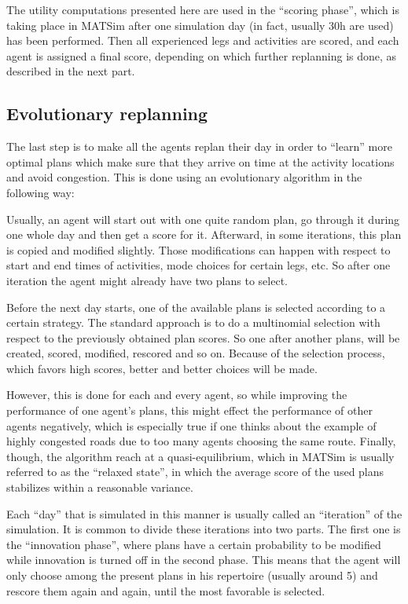 The utility computations presented here are used in the ``scoring phase'', which
is taking place in MATSim after one simulation day (in fact, usually 30h are
used) has been performed. Then all experienced legs and activities are scored, and
each agent is assigned a final score, depending on which further replanning is done,
as described in the next part.

\subsection{Evolutionary replanning}

The last step is to make all the agents replan their day
in order to ``learn'' more optimal plans which
make sure that they arrive on time at the activity locations and avoid congestion.
This is done using an evolutionary algorithm in the following way:

Usually, an agent will start out with one quite random plan, go through it during
one whole day and then get a score for it. Afterward, in some iterations, this
plan is copied and modified slightly. Those modifications can happen with respect
to start and end times of activities, mode choices for certain legs, etc. So after
one iteration the agent might already have two plans to select.

Before the next day starts, one of the available plans is selected according to a certain
strategy. The standard approach is to do a multinomial selection with respect to
the previously obtained plan scores. So one after another plans, will be created,
scored, modified, rescored and so on. Because of the selection process, which
favors high scores, better and better choices will be made.

However, this is done for each and every agent, so while improving the performance
of one agent's plans, this might effect the performance of other agents negatively,
which is especially true if one thinks about the example of highly congested roads
due to too many agents choosing the same route. Finally, though, the algorithm reach
at a quasi-equilibrium, which in MATSim is usually referred to as the ``relaxed
state'', in which the average score of the used plans stabilizes within a
reasonable variance.

Each ``day'' that is simulated in this manner is usually called an ``iteration''
of the simulation. It is common to divide these iterations into two parts. The
first one is the ``innovation phase'', where plans have a certain probability to
be modified while innovation is turned off in the second phase. This means that
the agent will only choose among the present plans in his repertoire (usually
around 5) and rescore them again and again, until the most favorable is selected.

